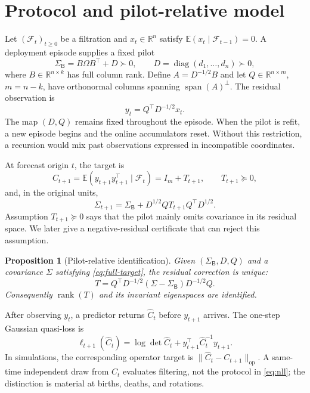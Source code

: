 \documentclass{article}
\newtheorem{proposition}[theorem]{Proposition}
\theoremstyle{definition}
\theoremstyle{remark}
\newcommand{\R}{\mathbb{R}}
\newcommand{\E}{\mathbb{E}}
\newcommand{\F}{\mathcal{F}}
\newcommand{\rank}{\operatorname{rank}}
\newcommand{\diag}{\operatorname{diag}}
\newcommand{\op}{\mathrm{op}}
\newcommand{\base}{\mathsf{B}}
\begin{document}
\section{Protocol and pilot-relative model}
\label{sec:model}

Let $(\F_t)_{t\ge0}$ be a filtration and $x_t\in\R^n$ satisfy $\E(x_t\mid\F_{t-1})=0$. A deployment episode supplies a fixed pilot
\begin{equation}
 \Sigma_{\base}=B\Omega B^\top+D\succ0,
 \qquad D=\diag(d_1,\ldots,d_n)\succ0,
 \label{eq:pilot}
\end{equation}
where $B\in\R^{n\times k}$ has full column rank. Define $A=D^{-1/2}B$ and let $Q\in\R^{n\times m}$, $m=n-k$, have orthonormal columns spanning $\operatorname{span}(A)^\perp$. The residual observation is
\begin{equation}
 y_t=Q^\top D^{-1/2}x_t.
 \label{eq:residual}
\end{equation}
The map $(D,Q)$ remains fixed throughout the episode. When the pilot is refit, a new episode begins and the online accumulators reset. Without this restriction, a recursion would mix past observations expressed in incompatible coordinates.

At forecast origin $t$, the target is
\begin{equation}
 C_{t+1}=\E(y_{t+1}y_{t+1}^\top\mid\F_t)=I_m+T_{t+1},
 \qquad T_{t+1}\succeq0,
 \label{eq:target}
\end{equation}
and, in the original units,
\begin{equation}
 \Sigma_{t+1}=\Sigma_{\base}+D^{1/2}QT_{t+1}Q^\top D^{1/2}.
 \label{eq:full-target}
\end{equation}
Assumption $T_{t+1}\succeq0$ says that the pilot mainly omits covariance in its residual space. We later give a negative-residual certificate that can reject this assumption.

\begin{proposition}[Pilot-relative identification]
\label{prop:id}
Given $(\Sigma_{\base},D,Q)$ and a covariance $\Sigma$ satisfying \eqref{eq:full-target}, the residual correction is unique:
\begin{equation}
 T=Q^\top D^{-1/2}(\Sigma-\Sigma_{\base})D^{-1/2}Q.
\end{equation}
Consequently $\rank(T)$ and its invariant eigenspaces are identified.
\end{proposition}

After observing $y_t$, a predictor returns $\widehat C_t$ before $y_{t+1}$ arrives. The one-step Gaussian quasi-loss is
\begin{equation}
 \ell_{t+1}(\widehat C_t)=\log\det\widehat C_t+y_{t+1}^\top\widehat C_t^{-1}y_{t+1}.
 \label{eq:nll}
\end{equation}
In simulations, the corresponding operator target is $\|\widehat C_t-C_{t+1}\|_{\op}$. A same-time independent draw from $C_t$ evaluates filtering, not the protocol in \eqref{eq:nll}; the distinction is material at births, deaths, and rotations.
\end{document}
